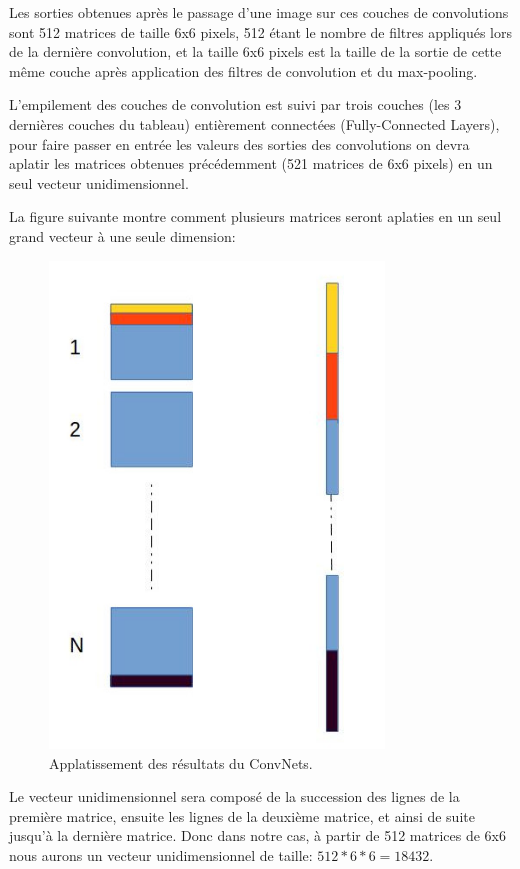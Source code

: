 	Les sorties obtenues après le passage d'une image sur ces couches de convolutions sont 512 matrices de taille 6x6 pixels, 512 étant le nombre de filtres appliqués lors de la dernière convolution, et la taille 6x6 pixels est la taille de la sortie de cette même couche après application des filtres de convolution et du max-pooling.

	L'empilement des couches de convolution est suivi par trois couches (les 3 dernières couches du tableau) entièrement connectées (Fully-Connected Layers), pour faire passer en entrée les valeurs des sorties des convolutions on devra aplatir les matrices obtenues précédemment (521 matrices de 6x6 pixels) en un seul vecteur unidimensionnel.
	
	La figure suivante montre comment plusieurs matrices seront aplaties en un seul grand vecteur à une seule dimension:

\begin{figure}[H]
	\centering
		\includegraphics[width=3.5in]{Figures/flattening.jpg}
	\caption[An Electron]{Applatissement des résultats du ConvNets.}
	\label{fig:Electron}
\end{figure}

	Le vecteur unidimensionnel sera composé de la succession des lignes de la première matrice, ensuite les lignes de la deuxième matrice, et ainsi de suite jusqu'à la dernière matrice. Donc dans notre cas, à partir de 512 matrices de 6x6 nous aurons un vecteur unidimensionnel de taille: $512*6*6 = 18432$.

